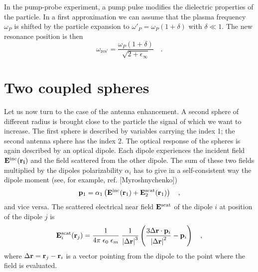 In the pump-probe experiment, a pump pulse modifies the dielectric properties of
the particle. In a first approximation we can assume that the plasma frequency
$\omega_P$ is shifted by the particle expansion to $\omega'_P = \omega_P (1 +
\delta)$ with $\delta \ll 1$. The new resonance position is then
%
\begin{equation} \label{eq:omega_equal}
 \omega_{\text{res'}} = \frac{\omega_P (1 + \delta)}{\sqrt{2 +
\epsilon_{\infty}} }  \quad .
\end{equation}

\section{Two coupled spheres}

Let us now turn to the case of the antenna enhancement. A second sphere of
different radius is brought close to the particle the signal of which we want to
increase. The first sphere is described by variables carrying the index 1; the
second antenna sphere has the index 2. The optical response of the spheres is
again described by an optical dipole. Each dipole experiences the incident field
$\bf{E}^{\text{inc}}(\bf{r}_i)$ and the field scattered from the other dipole.
The sum of these two fields multiplied by the dipoles polarizability $\alpha_i$
has to give in a self-consistent way the dipole moment (see, for example, ref. [Myroshnychenko])
%
\begin{equation} \label{eq:equationsystem}
     {\bf p}_1 = \alpha_1 \left( {\bf E}^{\text{inc}}({\bf r}_1) +
{\bf E}^{\text{scat}}_2({\bf r}_1) \right) \quad ,
\end{equation}
%
and vice versa. The scattered electrical near field ${\bf E}^{\text{scat}}$ of the dipole $i$ at position of the dipole $j$ is
%
\begin{equation}
  {\bf E}^{\text{scat}}_i({\bf r}_j) = 
  \frac{1}{4 \pi \;  \epsilon_0 \; \epsilon_m} \; 
     \frac{1}{\left| \Delta {\bf r} \right|^3} 
          \left( \frac{3 \Delta {\bf r} \cdot {\bf p}_i}{\left| \Delta {\bf r} \right|^2}
- {\bf p}_i \right) \quad ,
\end{equation}
%
where $\Delta {\bf r} = {\bf r}_j - {\bf r}_i$ is a vector pointing from the dipole to the point where
the field is evaluated.



